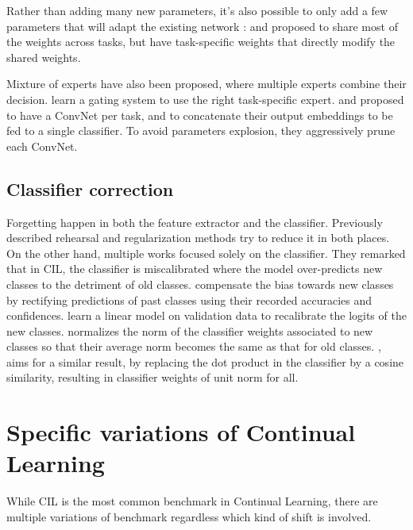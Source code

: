 Rather than adding many new parameters, it's also possible to only add a few parameters that will
adapt the existing network \citep{rebuffi2017visualadapters}: \cite{wen2020batchensemble} and
\cite{sun2019metatransfer} proposed to share most of the weights across tasks, but have
task-specific weights that directly modify the shared weights.

Mixture of experts \citep{masoudnia2014mixture} have also been proposed, where multiple experts
combine their decision. \cite{aljundi2017experts} learn a gating system to use the right
task-specific expert. \cite{yan2021der} and \cite{li2021preserve} proposed to have a \ac{ConvNet}
per task, and to concatenate their output embeddings to be fed to a single classifier. To avoid
parameters explosion, they aggressively prune each \ac{ConvNet}.

\subsection{Classifier correction}

Forgetting happen in both the feature extractor and the classifier. Previously described
rehearsal and regularization methods try to reduce it in both places. On the other hand, multiple
works focused solely on the classifier. They remarked that in \acf{CIL}, the classifier is
miscalibrated \citep{guo2017miscalibration} where the model over-predicts new classes to the
detriment of old classes. \cite{belouadah2019il2m} compensate the bias towards new classes by
rectifying predictions of past classes using their recorded accuracies and confidences.
\cite{wu2019bias_correction} learn a linear model on validation data to recalibrate the logits of
the new classes. \cite{zhao2020weightalignement} normalizes the norm of the classifier weights
associated to new classes so that their average norm becomes the same as that for old classes.
\cite{hou2019ucir}, aims for a similar result, by replacing the dot product in the classifier by a
cosine similarity, resulting in classifier weights of unit norm for all.

\section{Specific variations of Continual Learning}

While \acf{CIL} is the most common benchmark in Continual Learning, there are multiple variations of
benchmark regardless which kind of shift is involved.

